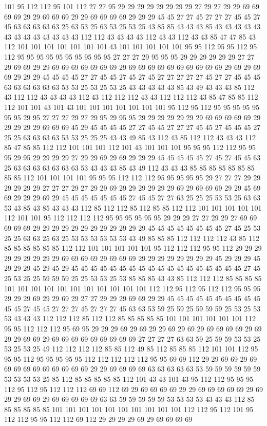 101 95 112 112 95 101 112 27 27 95 29 29 29 29 29 29 29 29 27 29 27 29 29 69 69 69 69 29 29 69 69 69 29 29 69 69 69 69 29 29 29 45 45 27 27 45 27 27 27 45 45 27 45 63 63 63 63 63 25 63 53 25 63 53 25 53 25 43 85 85 43 43 43 85 43 43 43 43 43 43 43 43 43 43 43 43 43 112 112 43 43 43 43 112 43 43 112 43 43 85 47 47 85 43 112 101 101 101 101 101 101 101 43 101 101 101 101 101 95 95 112 95 95 112 95 112 95 95 95 95 95 95 95 95 95 95 27 27 27 29 95 95 95 29 29 29 29 29 29 27 27 29 69 69 29 29 69 69 69 69 69 69 69 29 69 69 69 69 69 69 69 69 69 69 29 69 29 69 69 29 29 29 45 45 45 45 27 27 45 45 27 45 27 45 27 27 27 27 27 45 27 27 45 45 45 63 63 63 63 63 63 53 53 25 53 25 53 25 43 43 43 43 43 85 43 49 43 43 43 85 112 43 112 112 43 43 43 43 112 43 112 112 112 43 43 112 112 112 43 85 47 85 85 112 112 101 101 43 101 43 101 101 101 101 101 101 101 95 112 95 112 95 95 95 95 95 95 95 29 95 27 27 27 29 27 29 95 29 95 95 29 29 29 29 29 29 29 69 69 69 69 69 29 29 29 29 29 69 69 69 45 29 45 45 45 45 27 27 45 45 27 27 27 45 45 27 45 45 45 27 25 25 63 63 63 63 53 53 25 25 25 43 43 49 85 43 112 43 85 112 112 43 43 43 112 85 47 85 85 112 112 101 101 101 112 101 43 101 101 101 95 95 95 112 112 95 95 95 29 95 29 29 29 29 27 29 29 69 29 69 29 29 29 45 45 45 45 45 27 45 27 45 45 63 25 63 63 63 63 63 63 63 53 43 43 43 85 43 49 112 43 43 43 85 85 85 85 85 85 85 85 85 112 101 101 101 101 95 95 95 112 112 112 95 95 95 95 95 29 27 27 27 29 29 29 29 29 29 27 27 27 29 27 29 29 69 29 29 29 29 29 29 69 29 69 69 69 29 29 45 69 69 29 29 29 69 29 45 45 45 45 45 45 45 27 45 45 27 27 63 25 25 25 53 53 25 63 63 53 43 85 43 85 43 43 43 112 85 112 112 85 112 85 85 112 112 101 101 101 101 101 112 101 101 95 112 112 112 112 95 95 95 95 95 95 29 29 29 27 27 29 29 27 69 69 69 69 69 29 29 29 29 29 29 29 29 29 29 29 29 45 45 45 45 45 45 45 45 27 45 25 53 25 25 63 63 25 63 25 53 53 53 53 53 53 43 49 85 85 85 112 112 112 112 43 85 112 85 85 85 85 85 85 112 112 101 101 101 101 101 95 112 112 112 95 95 112 29 29 29 29 29 29 29 29 29 69 69 69 69 29 69 69 69 29 29 29 29 29 29 29 29 45 29 29 29 45 29 29 29 45 29 45 29 45 45 45 45 45 45 45 45 45 45 45 45 45 45 45 45 45 45 27 45 25 53 25 25 59 59 59 25 25 53 53 25 53 85 85 85 43 43 85 112 112 112 85 85 85 85 101 101 101 101 101 101 101 101 101 101 101 112 112 95 112 95 112 112 95 95 95 29 29 29 69 29 29 69 29 27 27 29 29 29 69 69 29 29 45 45 45 45 45 45 45 45 45 45 45 45 27 45 45 27 27 27 45 27 27 27 45 63 63 53 59 25 59 25 59 59 59 25 53 25 53 53 43 43 43 112 112 112 85 112 112 85 85 85 85 85 101 101 101 101 101 101 112 95 95 112 112 112 95 69 95 29 29 29 69 29 69 29 29 69 29 69 29 69 69 69 69 29 69 29 29 69 69 29 69 69 69 69 69 69 69 69 69 27 27 27 27 63 63 59 25 59 59 53 53 25 53 25 53 25 49 112 112 112 112 85 85 112 49 85 112 85 85 85 112 101 101 112 95 95 95 112 95 95 95 95 95 112 112 112 112 112 95 95 69 69 112 29 29 69 69 29 69 69 69 69 69 69 69 69 69 69 29 29 69 69 69 69 63 63 63 63 63 53 59 59 59 59 59 59 53 53 53 53 25 85 112 85 85 85 85 85 112 101 43 43 101 43 95 112 112 95 95 95 112 95 112 95 112 112 112 69 69 112 69 29 69 69 69 69 29 29 69 69 69 69 69 29 69 29 29 69 69 29 69 69 69 69 69 63 63 59 59 59 59 59 53 53 53 53 43 43 43 112 85 85 85 85 85 85 101 101 101 101 101 101 101 101 101 101 112 112 95 112 101 95 112 112 95 95 112 112 69 112 29 29 29 29 69 29 69 69 69 69 